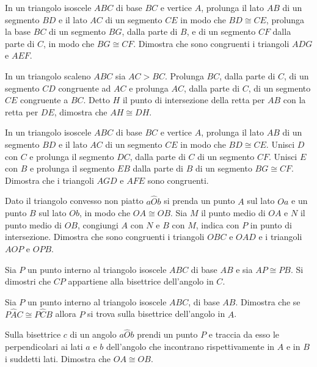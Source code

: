 \begin{multicols}{2}
\begin{esercizio}
\label{ese:2.65}
In un triangolo isoscele $ABC$ di base $BC$ e vertice $A$, prolunga 
il lato $AB$ di un segmento $BD$ e il lato $AC$ di un segmento $CE$ 
in modo che $BD\cong CE$, prolunga la base $BC$ di un segmento $BG$, 
dalla parte di $B$, e di un segmento $CF$ dalla parte di $C$, in modo 
che $BG\cong CF$. Dimostra che sono congruenti i triangoli $ADG$ e 
$AEF$.
\end{esercizio}

\begin{esercizio}
\label{ese:2.66}
In un triangolo scaleno $ABC$ sia $AC>BC$. Prolunga $BC$, dalla parte 
di $C$, di un segmento $CD$ congruente ad $AC$ e prolunga $AC$, dalla 
parte di $C$, di un segmento $CE$ congruente a $BC$. Detto $H$ il 
punto di intersezione della retta per $AB$ con la retta per $DE$, 
dimostra che $AH\cong DH$.
\end{esercizio}

\begin{esercizio}
\label{ese:2.67}
In un triangolo isoscele $ABC$ di base $BC$ e vertice $A$, prolunga 
il lato $AB$ di un segmento $BD$ e il lato $AC$ di un segmento $CE$ 
in modo che $BD\cong CE$. Unisci $D$ con $C$ e prolunga il segmento 
$DC$, dalla parte di $C$ di un segmento $CF$. Unisci $E$ con $B$ e 
prolunga il segmento $EB$ dalla parte di $B$ di un segmento $BG\cong 
CF$. Dimostra che i triangoli $AGD$ e $AFE$ sono congruenti.
\end{esercizio}

\begin{esercizio}
\label{ese:2.68}
Dato il triangolo convesso non piatto $a\widehat{O}b$ si prenda un 
punto $A$ sul lato $Oa$ e un punto $B$ sul lato $Ob$, in modo che 
$OA\cong OB$. Sia $M$ il punto medio di $OA$ e $N$ il punto medio di 
$OB$, congiungi $A$ con $N$ e $B$ con $M$, indica con $P$ in punto di 
intersezione. Dimostra che sono congruenti i triangoli $OBC$ e $OAD$ 
e i triangoli $AOP$ e $OPB$.
\end{esercizio}

\begin{esercizio}
\label{ese:2.71}
Sia $P$ un punto interno al triangolo isoscele $ABC$ di base $AB$ e 
sia $AP\cong PB$. Si dimostri che $CP$ appartiene alla bisettrice 
dell'angolo in $C$.
\end{esercizio}

\begin{esercizio}
\label{ese:2.81}
Sia $P$ un punto interno al triangolo isoscele $ABC$, di base $AB$. 
Dimostra che se $P\widehat{A}C\cong P\widehat{C}B$ allora $P$ si 
trova sulla bisettrice dell'angolo in $A$.
\end{esercizio}

\begin{esercizio}
\label{ese:2.89}
Sulla bisettrice $c$ di un angolo $a\widehat{O}b$ prendi un punto $P$ 
e traccia da esso le perpendicolari ai lati $a$ e $b$ dell'angolo che 
incontrano rispettivamente in $A$ e in $B$ i suddetti lati. Dimostra 
che $OA\cong OB$.
\end{esercizio}

\end{multicols}

